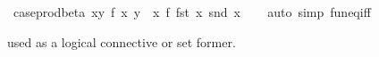 \begin{isabellebody}
\endisatagML
{\isafoldML}%
%
\isadelimML
%
\endisadelimML
\isanewline
\isanewline
{}\isamarkupfalse%
\ case{\isacharunderscore}{\kern0pt}prod{\isacharunderscore}{\kern0pt}beta{\isacharprime}{\kern0pt}{\isacharcolon}{\kern0pt}\ {\isachardoublequoteopen}{\isacharparenleft}{\kern0pt}{\isasymlambda}{\isacharparenleft}{\kern0pt}x{\isacharcomma}{\kern0pt}y{\isacharparenright}{\kern0pt}{\isachardot}{\kern0pt}\ f\ x\ y{\isacharparenright}{\kern0pt}\ {\isacharequal}{\kern0pt}\ {\isacharparenleft}{\kern0pt}{\isasymlambda}x{\isachardot}{\kern0pt}\ f\ {\isacharparenleft}{\kern0pt}fst\ x{\isacharparenright}{\kern0pt}\ {\isacharparenleft}{\kern0pt}snd\ x{\isacharparenright}{\kern0pt}{\isacharparenright}{\kern0pt}{\isachardoublequoteclose}\isanewline
%
\isadelimproof
\ \ %
\endisadelimproof
%
\isatagproof
{}\isamarkupfalse%
\ {\isacharparenleft}{\kern0pt}auto\ simp{\isacharcolon}{\kern0pt}\ fun{\isacharunderscore}{\kern0pt}eq{\isacharunderscore}{\kern0pt}iff{\isacharparenright}{\kern0pt}%
\endisatagproof
{\isafoldproof}%
%
\isadelimproof
%
\endisadelimproof
%
\begin{isamarkuptext}%
\medskip {} used as a logical connective or set former.


\end{isamarkuptext}
\end{isabellebody}
